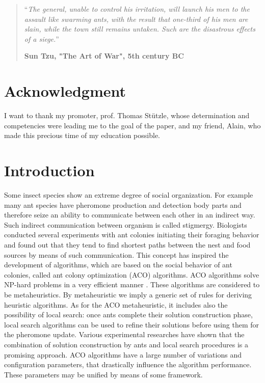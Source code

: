 \documentclass[11pt,a4paper,oneside]{book}
\begin{document}
\begin{quotation}
\noindent ``\emph{The general, unable to control his irritation, will launch his men
to the assault like swarming ants, with the result that one-third of
his men are slain, while the town still remains untaken. Such are
the disastrous effects of a siege.}''
\begin{flushright}\textbf{Sun Tzu, "The Art of War", 5th century BC}\end{flushright}
\end{quotation}
\chapter*{Acknowledgment}
\thispagestyle{empty} 

\noindent I want to thank my promoter, prof. Thomas St{\"u}tzle, whose determination and competencies were leading me to the goal of the paper, and my friend, Alain, who made this precious time of my education possible.

\thispagestyle{empty} 
\setcounter{page}{0}
\tableofcontents
\mainmatter 
\chapter{Introduction}
\setcounter{page}{1}
\vspace*{0.5cm}

Some insect species show an extreme degree of social organization. For example many ant species have pheromone production and detection body parts and therefore seize an ability to communicate between each other in an indirect way. Such indirect communication between organism is called stigmergy. Biologists conducted several experiments with ant colonies initiating their foraging behavior and found out that they tend to find shortest paths between the nest and food sources by means of such communication. This concept has inspired the development of algorithms, which are based on the social behavior of ant colonies, called ant colony optimization (ACO) algorithms. ACO algorithms solve NP-hard problems in a very efficient manner \cite{Dorigo1996}. These algorithms are considered to be metaheuristics. By metaheuristic we imply a generic set of rules for deriving heuristic algorithms. As for the ACO metaheuristic, it includes also the possibility of local search: once ants complete their solution construction phase, local search algorithms can be used to refine their solutions before using them for the pheromone update. Various experimental researches have shown that the combination of solution cconstruction by ants and local search procedures is a promising approach. ACO algorithms have a large number of variations and configuration parameters, that drastically influence the algorithm performance. These parameters may be unified by means of some framework.
\end{document}
